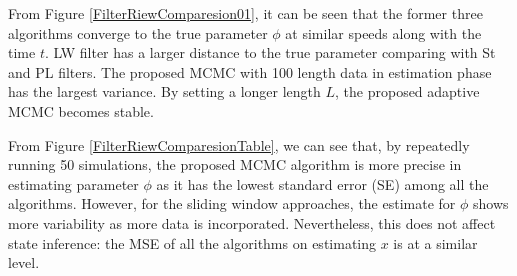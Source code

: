 

From Figure \ref{FilterRiewComparesion01}, it can be seen that the former three algorithms converge to the true parameter $\phi$ at similar speeds along with the time $t$. LW filter has a larger distance to the true parameter comparing with St and PL filters. The proposed MCMC with 100 length data in estimation phase has the largest variance. By setting a longer length $L$, the proposed adaptive MCMC becomes stable. 

From Figure \ref{FilterRiewComparesionTable}, we can see that, by repeatedly running 50 simulations, the proposed MCMC algorithm is more precise in estimating parameter $\phi$ as it has the lowest standard error (SE) among all the algorithms. However, for the sliding window approaches, the estimate for $\phi$ shows more variability as more data is incorporated. Nevertheless, this does not affect state inference: the MSE of all the algorithms on estimating $x$ is at a similar level. 


